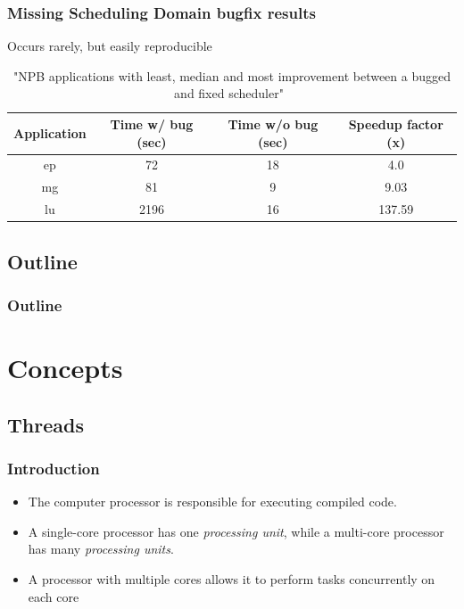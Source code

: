 \documentclass{beamer}
\begin{document}
\begin{frame}
\frametitle{Missing Scheduling Domain bugfix results}

Occurs rarely, but easily reproducible

\begin{table}
	\centering
	\begin{tabular}{| c | c | c | c |}
		\hline			
	  	Application & Time w/ bug (sec) & Time w/o bug (sec) & Speedup factor (x) \\ \hline
		ep & 72 & 18 & 4.0 \\ \hline
		mg & 81 & 9 & 9.03 \\ \hline
		lu & 2196 & 16 & 137.59 \\ \hline	
		\hline
	\end{tabular}
	\caption{"NPB applications with least, median and most improvement between a bugged and fixed scheduler"~\cite{Lozi:2016}}
\end{table}
\end{frame}



\subsection*{Outline}

\begin{frame}
  \frametitle{Outline}
  \tableofcontents[hideallsubsections]
\end{frame}

\section[Concepts]{Concepts}

\subsection[Threads]{Threads}

\begin{frame}
\frametitle{Introduction}
	\begin{itemize}
	\item The computer processor is responsible for executing compiled code.
		\item A single-core processor has one \emph{processing unit}, while a multi-core processor has many \emph{processing units}.

	\item A processor with multiple cores allows it to perform tasks concurrently on each core
	\end{itemize}
\end{frame}
\end{document}
